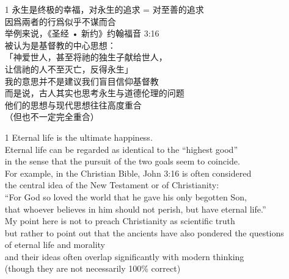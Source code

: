 

\usepackage[left=1.5cm, right=1.5cm,top=1cm,bottom=1cm]{geometry}




\begin{itemize}

	\item[1] 永生是终极的幸福，对永生的追求 = 对至善的追求 \\
	因爲兩者的行爲似乎不谋而合 \\
	举例来说，《圣经 • 新约》约翰福音 3:16 \\
	被认为是基督教的中心思想： \\
	「神爱世人，甚至将祂的独生子献给世人， \\
	让信祂的人不至灭亡，反得永生」 \\
	我的意思并不是建议我们盲目信仰基督教 \\
	而是说，古人其实也思考永生与道德伦理的问题 \\
	他们的思想与现代思想往往高度重合 \\
	（但也不一定完全重合）

	\item[1] Eternal life is the ultimate happiness. \\
	Eternal life can be regarded as identical to the ``highest good'' \\
	in the sense that the pursuit of the two goals seem to coincide. \\
	For example, in the Christian Bible, John 3:16 is often considered \\
	the central idea of the New Testament or of Christianity: \\
	``For God so loved the world that he gave his only begotten Son, \\
	that whoever believes in him should not perish, but have eternal life.'' \\
	My point here is not to preach Christianity as scientific truth \\
	but rather to point out that the ancients have also pondered the questions \\
	of eternal life and morality \\
	and their ideas often overlap significantly with modern thinking \\
	(though they are not necessarily 100\% correct)


\end{itemize}
